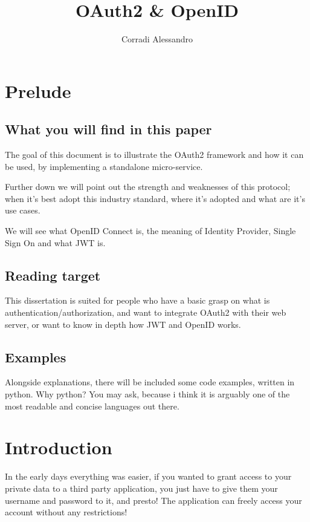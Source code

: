 \documentclass[11pt]{style}
\title{OAuth2 \& OpenID}
\author{Corradi Alessandro}
\begin{document}
\maketitle{}
\tableofcontents
\clearpage
{}


\section{Prelude}
\subsection{What you will find in this paper}
The goal of this document is to illustrate the OAuth2 framework and
how it can be used, by implementing a standalone micro-service.

Further down we will point out the strength and weaknesses of this protocol; when
it's best adopt this industry standard, where it's adopted and what are it's use
cases.

We will see what OpenID Connect is, the meaning of Identity Provider, Single
Sign On and what JWT is.

\subsection{Reading target}
This dissertation is suited for people who have a basic grasp on what is
authentication/authorization, and want to integrate OAuth2 with their web
server, or want to know in depth how JWT and OpenID works.

\subsection{Examples}
Alongside explanations, there will be included some code examples, written in
python.
Why python? You may ask, because i think it is arguably one of the most readable
and concise languages out there.

\section{Introduction}
In the early days everything was easier, if you wanted to grant access to your
private data to a third party application, you just have to give them your
username and password to it, and presto! The application can freely access your
account without any restrictions!
\end{document}

